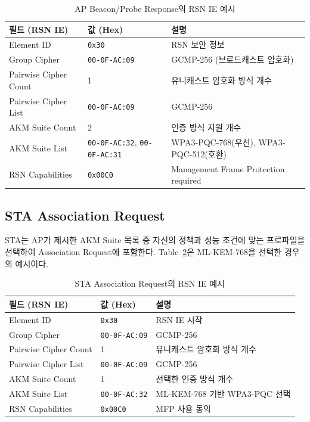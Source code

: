 \documentclass[11pt]{article}
\newcommand{\hex}[1]{\texttt{0x#1}}
\newcommand{\code}[1]{\texttt{#1}}
\theoremstyle{definition}
\theoremstyle{plain}
\begin{document}
\begin{table}[H]\centering
\caption{AP Beacon/Probe Response의 RSN IE 예시}\label{tab:ap-rsn}
\small
\begin{tabularx}{\linewidth}{@{}llX@{}}
\toprule
필드 (RSN IE) & 값 (Hex) & 설명 \\ \midrule
Element ID & \hex{30} & RSN 보안 정보 \\
Group Cipher & \code{00-0F-AC:09} & GCMP-256 (브로드캐스트 암호화) \\
Pairwise Cipher Count & 1 & 유니캐스트 암호화 방식 개수 \\
Pairwise Cipher List & \code{00-0F-AC:09} & GCMP-256 \\
AKM Suite Count & 2 & 인증 방식 지원 개수 \\
AKM Suite List & \code{00-0F-AC:32}, \code{00-0F-AC:31}
   & WPA3-PQC-768(우선), WPA3-PQC-512(호환) \\
RSN Capabilities & \hex{00C0} & Management Frame Protection required \\
\bottomrule
\end{tabularx}
\end{table}

\subsection{STA Association Request}
STA는 AP가 제시한 AKM Suite 목록 중 자신의 정책과 성능 조건에 맞는
프로파일을 선택하여 Association Request에 포함한다. Table~\ref{tab:sta-rsn}은
ML-KEM-768을 선택한 경우의 예시이다.

\begin{table}[H]\centering
\caption{STA Association Request의 RSN IE 예시}\label{tab:sta-rsn}
\small
\begin{tabularx}{\linewidth}{@{}llX@{}}
\toprule
필드 (RSN IE) & 값 (Hex) & 설명 \\ \midrule
Element ID & \hex{30} & RSN IE 시작 \\
Group Cipher & \code{00-0F-AC:09} & GCMP-256 \\
Pairwise Cipher Count & 1 & 유니캐스트 암호화 방식 개수 \\
Pairwise Cipher List & \code{00-0F-AC:09} & GCMP-256 \\
AKM Suite Count & 1 & 선택한 인증 방식 개수 \\
AKM Suite List & \code{00-0F-AC:32} & ML-KEM-768 기반 WPA3-PQC 선택 \\
RSN Capabilities & \hex{00C0} & MFP 사용 동의 \\
\bottomrule
\end{tabularx}
\end{table}
\end{document}
